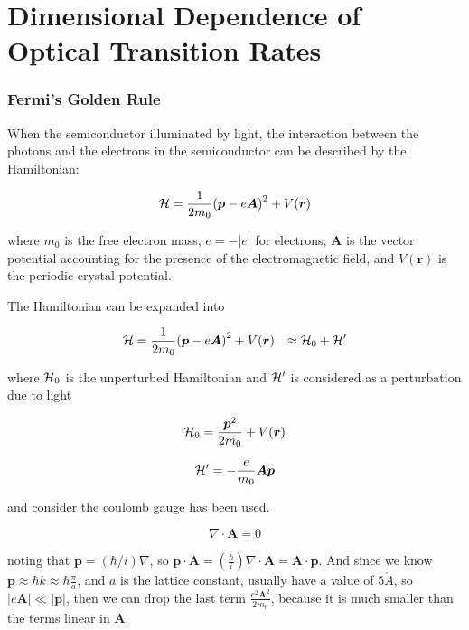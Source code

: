 \chapter{Dimensional Dependence of Optical Transition Rates} \label{RM}
 

\subsection{Fermi's Golden Rule} \label{dust_corrections}

When the semiconductor illuminated by light, the interaction between the photons and the electrons in the semiconductor can be described by the Hamiltonian:

\begin{equation}
  \mathcal{H} = \frac{1}{2m_0}{(\bm{p}-e\bm{A})}^2+V(\bm{r})
\end{equation}

where $m_0$ is the free electron mass, $e=-|e|$ for electrons, $\bm{A}$ is the vector potential accounting for the presence of the electromagnetic field, and $V(\bm{r})$ is the periodic crystal potential.

The Hamiltonian can be expanded into


\begin{eqnarray}
  & \mathcal{H} = \frac{1}{2m_0}{(\bm{p}-e\bm{A})}^2+V(\bm{r})
  &  \approx \mathcal{H}_0+\mathcal{H}^\prime
\end{eqnarray}

where $\mathcal{H}_0$ is the unperturbed Hamiltonian and ${\mathcal{H}}^\prime$ is considered as a perturbation due to light

\begin{equation}
\mathcal{H}_0=\frac{{\bm{p}}^2}{2m_0}+V(\bm{r})
\end{equation}

\begin{equation}
  \mathcal{H}^\prime=-\frac{e}{m_0}\bm{A}\bm{p}
\end{equation}

and consider the coulomb gauge has been used.

\begin{equation}
  \nabla\cdot\bm{A}=0
\end{equation}

noting that $\bm{p}=(\hbar/i)\nabla$, so $\bm{p}\cdot\bm{A}=(\frac{\hbar}{i})\nabla\cdot\bm{A}=\bm{A}\cdot\bm{p}$. And since we know $\bm{p}\approx\hbar{k}\approx\hbar\frac{\pi}{a}$, and $a$ is the lattice constant, usually have a value of $5\mathring{A}$, so $|e\bm{A}|\ll|\bm{p}|$, then we can drop the last term $\frac{e^2{\bm{A}}^2}{2m_0}$, because it is much smaller than the terms linear in $\bm{A}$.

